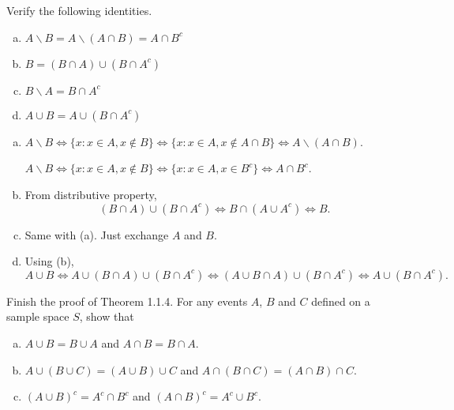 \documentclass[12pt]{elegantbook}
\begin{document}

\chapter{}

    \setcounter{exer}{1}
    \begin{exercise}
        Verify the following identities. 
        \begin{enumerate}[(a)]
            \item $A\backslash B=A\backslash (A\cap B)=A\cap B^c$
            \item $B=(B\cap A)\cup (B\cap A^c)$
            \item $B\backslash A=B\cap A^c$
            \item $A\cup B=A\cup (B\cap A^c)$
        \end{enumerate}
    \end{exercise}

    \begin{solution}
        \begin{enumerate}[(a)]
            \item $A\backslash B \Leftrightarrow \{x: x\in A, x\notin B\}\Leftrightarrow \{x:x\in A, x\notin A\cap B\}\Leftrightarrow A\backslash (A\cap B)$. 
            
            $A\backslash B \Leftrightarrow \{x: x\in A, x\notin B\}\Leftrightarrow\{x:x\in A, x\in B^c\}\Leftrightarrow A\cap B^c$. 
            \item From distributive property, 
            \[
                (B\cap A)\cup (B\cap A^c) \Leftrightarrow B\cap (A\cup A^c)\Leftrightarrow B. 
            \]
            \item Same with (a). Just exchange $A$ and $B$. 
            \item Using (b), \[
                A\cup B\Leftrightarrow A\cup (B\cap A)\cup (B\cap A^c)\Leftrightarrow (A\cup B\cap A)\cup (B\cap A^c)\Leftrightarrow A\cup (B\cap A^c). 
            \]
        \end{enumerate}
    \end{solution}

    \begin{exercise}
        Finish the proof of Theorem 1.1.4. For any events $A$, $B$ and $C$ defined on a sample space $S$, show that
        \begin{enumerate}[(a)]
            \item $A\cup B=B\cup A$ and $A\cap B=B\cap A$. 
            \item $A\cup (B\cup C)=(A\cup B)\cup C$ and $A\cap (B\cap C)=(A\cap B)\cap C$. 
            \item $(A\cup B)^c=A^c\cap B^c$ and $(A\cap B)^c=A^c\cup B^c$. 
        \end{enumerate}
    \end{exercise}
\end{document}
